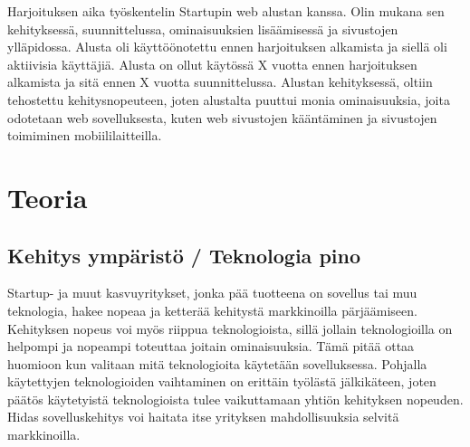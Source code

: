 \documentclass[11pt,a4paper,titlepage,oneside]{article}
\begin{document}
Harjoituksen aika työskentelin Startupin web alustan kanssa. 
Olin mukana sen kehityksessä, suunnittelussa, ominaisuuksien lisäämisessä ja sivustojen ylläpidossa.
Alusta oli käyttöönotettu ennen harjoituksen alkamista ja siellä oli aktiivisia käyttäjiä.
Alusta on ollut käytössä X vuotta ennen harjoituksen alkamista ja sitä ennen X vuotta suunnittelussa.
%
Alustan kehityksessä, oltiin tehostettu kehitysnopeuteen,
joten alustalta puuttui monia ominaisuuksia, joita odotetaan web sovelluksesta, 
kuten web sivustojen kääntäminen ja sivustojen toimiminen mobiililaitteilla.
\medskip

























\newpage
\section{Teoria}                %



\subsection{Kehitys ympäristö / Teknologia pino}




Startup- ja muut kasvuyritykset, jonka pää tuotteena on sovellus tai muu teknologia, hakee nopeaa ja ketterää kehitystä markkinoilla pärjäämiseen.
Kehityksen nopeus voi myös riippua teknologioista, sillä jollain teknologioilla on helpompi ja nopeampi toteuttaa joitain ominaisuuksia.
Tämä pitää ottaa huomioon kun valitaan mitä teknologioita käytetään sovelluksessa.
Pohjalla käytettyjen teknologioiden vaihtaminen on erittäin työlästä jälkikäteen,
joten päätös käytetyistä teknologioista tulee vaikuttamaan yhtiön kehityksen nopeuden.
Hidas sovelluskehitys voi haitata itse yrityksen mahdollisuuksia selvitä markkinoilla.
\medskip
\end{document}

